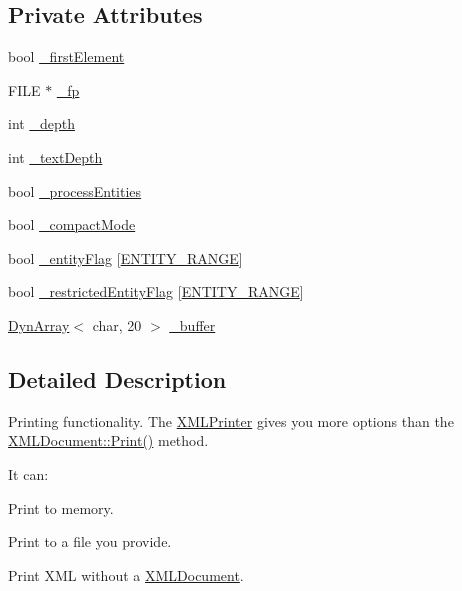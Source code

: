 \subsection*{Private Attributes}
\begin{DoxyCompactItemize}
\item 
bool \hyperlink{classtinyxml2_1_1_x_m_l_printer_abbd7ac45d97ae5eceec12d6c058119f9}{\-\_\-first\-Element}
\item 
F\-I\-L\-E $\ast$ \hyperlink{classtinyxml2_1_1_x_m_l_printer_a79d91decf17990f7ce18b592f3fdf44e}{\-\_\-fp}
\item 
int \hyperlink{classtinyxml2_1_1_x_m_l_printer_a19cd59a9dbe4b666264803fb91ac8ec1}{\-\_\-depth}
\item 
int \hyperlink{classtinyxml2_1_1_x_m_l_printer_a3c5a442e57131faefde97188e92144f3}{\-\_\-text\-Depth}
\item 
bool \hyperlink{classtinyxml2_1_1_x_m_l_printer_a3e27c4b4fe791a96e4e139b5034e190b}{\-\_\-process\-Entities}
\item 
bool \hyperlink{classtinyxml2_1_1_x_m_l_printer_a7bc067aa3f0dcee68e4ac75e19117bd0}{\-\_\-compact\-Mode}
\item 
bool \hyperlink{classtinyxml2_1_1_x_m_l_printer_a334eb34c43f21daebef9341b4768c275}{\-\_\-entity\-Flag} \mbox{[}\hyperlink{classtinyxml2_1_1_x_m_l_printer_abd08e8da55b22d059d0484c53db1fae8a2ddc02813235fe451809606959166db5}{E\-N\-T\-I\-T\-Y\-\_\-\-R\-A\-N\-G\-E}\mbox{]}
\item 
bool \hyperlink{classtinyxml2_1_1_x_m_l_printer_a5df242509d42ae1c9128924121ebe093}{\-\_\-restricted\-Entity\-Flag} \mbox{[}\hyperlink{classtinyxml2_1_1_x_m_l_printer_abd08e8da55b22d059d0484c53db1fae8a2ddc02813235fe451809606959166db5}{E\-N\-T\-I\-T\-Y\-\_\-\-R\-A\-N\-G\-E}\mbox{]}
\item 
\hyperlink{classtinyxml2_1_1_dyn_array}{Dyn\-Array}$<$ char, 20 $>$ \hyperlink{classtinyxml2_1_1_x_m_l_printer_a19fca2e934576a892fefe2f602874d59}{\-\_\-buffer}
\end{DoxyCompactItemize}


\subsection{Detailed Description}
Printing functionality. The \hyperlink{classtinyxml2_1_1_x_m_l_printer}{X\-M\-L\-Printer} gives you more options than the \hyperlink{classtinyxml2_1_1_x_m_l_document_a686ea28672c0e0c60383ec28148c1ac0}{X\-M\-L\-Document\-::\-Print()} method.

It can\-:
\begin{DoxyEnumerate}
\item Print to memory.
\item Print to a file you provide.
\item Print X\-M\-L without a \hyperlink{classtinyxml2_1_1_x_m_l_document}{X\-M\-L\-Document}.
\end{DoxyEnumerate}

